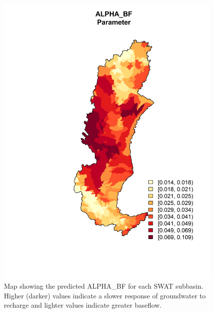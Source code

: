 \begin{figure}[h!]
	\centering
	\includegraphics[width=\textwidth]{./img/alpha_bf.png}
	\caption{Map showing the predicted ALPHA\_BF for each SWAT subbasin. Higher (darker) values indicate a slower response of groundwater to recharge and lighter
	values indicate greater baseflow.}
	\label{fig:alpha_bf}
\end{figure}

